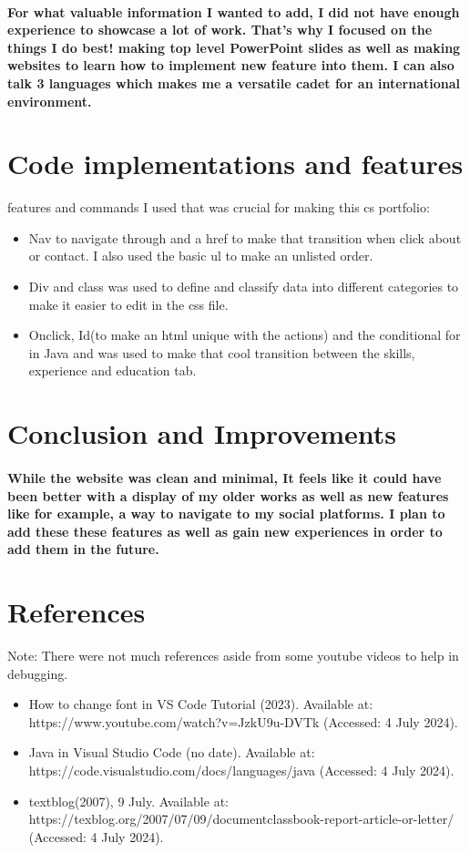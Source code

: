 \documentclass[12pt, book]{article}
\begin{document}
\paragraph{For what valuable information I wanted to add, I did not have enough experience to showcase a lot of work. That's why I focused on the things I do best! making top level PowerPoint slides as well as making websites to learn how to implement new feature into them. I can also talk 3 languages which makes me a versatile cadet for an international environment.}

\section{Code implementations and features}
features and commands I used that was crucial for making this cs portfolio:
\begin{itemize}
    \item Nav to navigate through and a href to make that transition when click about or contact. I also used the basic ul to make an unlisted order.
    \item Div and class was used to define and classify data into different categories to make it easier to edit in the css file.
    \item Onclick, Id(to make an html unique with the actions) and the conditional for in Java and was used to make that cool transition between the skills, experience and education tab.
\end{itemize}

\section{Conclusion and Improvements}
\paragraph{While the website was clean and minimal, It feels like it could have been better with a display of my older works as well as new features like for example, a way to navigate to my social platforms. I plan to add these these features as well as gain new experiences in order to add them in the future.}

\section{References}
Note: There were not much references aside from some youtube videos to help in debugging.
\begin{itemize}
    \item How to change font in VS Code Tutorial (2023). Available at:\\ https://www.youtube.com/watch?v=JzkU9u-DVTk (Accessed: 4 July 2024).
    \item Java in Visual Studio Code (no date). Available at:\\ https://code.visualstudio.com/docs/languages/java (Accessed: 4 July 2024).
    \item textblog(2007), 9 July. Available at: \\https://texblog.org/2007/07/09/documentclassbook-report-article-or-letter/ (Accessed: 4 July 2024).

\end{itemize}
\end{document}
